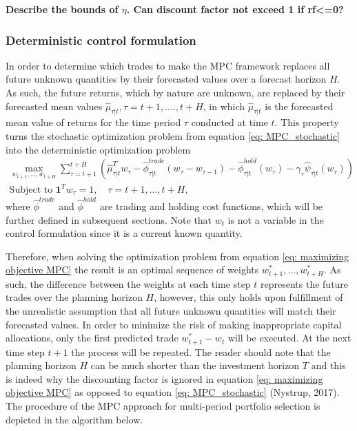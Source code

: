 \textbf{Describe the bounds of $\eta$. Can discount factor not exceed 1 if rf<=0?}

\subsubsection{Deterministic control formulation}

In order to determine which trades to make the MPC framework replaces all future unknown quantities by their forecasted values over a forecast horizon $H$. As such, the future returns, which by nature are unknown, are replaced by their forecasted mean values $\hat{\mu}_{\tau|t},\tau = t+1,....,t+H$, in which $\hat{\mu}_{\tau|t}$ is the forecasted mean value of returns for the time period $\tau$ conducted at time $t$. This property turns the stochastic optimization problem from equation \ref{eq: MPC_stochastic} into the deterministic optimization problem 
\begin{equation}
\begin{split}
    \max_{w_{t+1},\ldots,w_{t+H}} \sum_{\tau=t+1}^{t+H}(\hat{\mu}_{\tau|t}^Tw_\tau-\hat{\phi}_{\tau|t}^{trade}(w_\tau-w_{\tau-1})-\hat{\phi}_{\tau|t}^{hold}(w_\tau)-\gamma_\tau\hat{\psi}_{\tau|t}(w_\tau))
    \label{eq: maximizing objective MPC}
    \\
    \text{Subject to } \mathbf{1}^Tw_\tau=1, \quad \tau = t+1,...,t+H,
\end{split}    
\end{equation}
where $\hat{\phi}^{trade}$ and $\hat{\phi}^{hold}$ are trading and holding cost functions, which will be further defined in subsequent sections. Note that $w_t$ is not a variable in the control formulation since it is a current known quantity. 

Therefore, when solving the optimization problem from equation \ref{eq: maximizing objective MPC} the result is an optimal sequence of weights $w_{t+1}^*,..., w_{t+H}^*$. As such, the difference between the weights at each time step $t$ represents the future trades over the planning horizon $H$, however, this only holds upon fulfillment of the unrealistic assumption that all future unknown quantities will match their forecasted values. In order to minimize the risk of making inappropriate capital allocations, only the first predicted trade $w_{t+1}^*-w_t$ will be executed. At the next time step $t+1$ the process will be repeated. The reader should note that the planning horizon $H$ can be much shorter than the investment horizon $T$ and this is indeed why the discounting factor is ignored in equation \ref{eq: maximizing objective MPC} as opposed to equation \ref{eq: MPC_stochastic} 
(Nystrup, 2017). The procedure of the MPC approach for multi-period portfolio selection is depicted in the algorithm below. 

